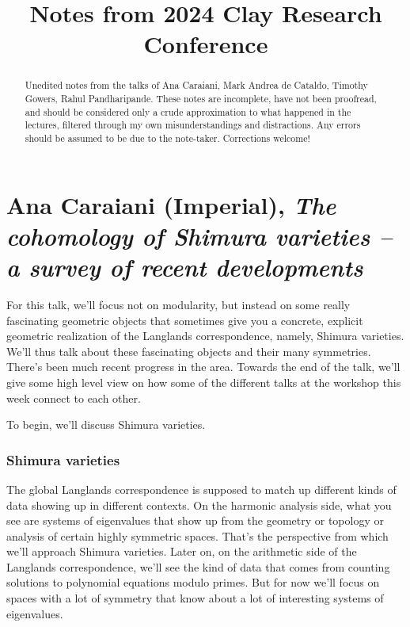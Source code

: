 \documentclass[reqno]{amsart} 
\begin{document}
\title{Notes from 2024 Clay Research Conference}

\begin{abstract}
  Unedited notes from the talks of Ana Caraiani, Mark Andrea de Cataldo, Timothy Gowers, Rahul Pandharipande.  These notes are incomplete, have not been proofread, and should be considered only a crude approximation to what happened in the lectures, filtered through my own misunderstandings and distractions.  Any errors should be assumed to be due to the note-taker.  Corrections welcome!
\end{abstract}

\maketitle

\tableofcontents

\part{Ana Caraiani (Imperial), \emph{The cohomology of Shimura varieties – a survey of recent developments}}

For this talk, we'll focus not on modularity, but instead on some really fascinating geometric objects that sometimes give you a concrete, explicit geometric realization of the Langlands correspondence, namely, Shimura varieties.  We'll thus talk about these fascinating objects and their many symmetries.  There's been much recent progress in the area.  Towards the end of the talk, we'll give some high level view on how some of the different talks at the workshop this week connect to each other.

To begin, we'll discuss Shimura varieties.

\section{Shimura varieties}

The global Langlands correspondence is supposed to match up different kinds of data showing up in different contexts.  On the harmonic analysis side, what you see are systems of eigenvalues that show up from the geometry or topology or analysis of certain highly symmetric spaces.  That's the perspective from which we'll approach Shimura varieties.  Later on, on the arithmetic side of the Langlands correspondence, we'll see the kind of data that comes from counting solutions to polynomial equations modulo primes.  But for now we'll focus on spaces with a lot of symmetry that know about a lot of interesting systems of eigenvalues.
\end{document}
